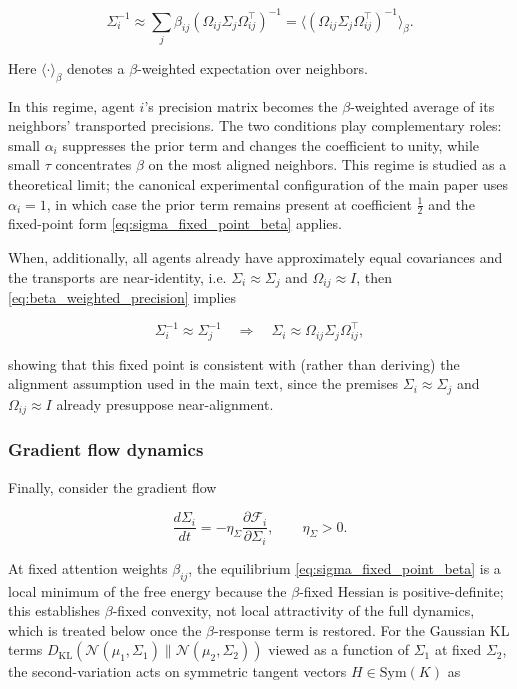 \documentclass[twoside,11pt]{article}
\begin{document}
\begin{equation}
\boxed{
\Sigma_i^{-1}
 \approx 
\sum_j \beta_{ij}
(\Omega_{ij}\Sigma_j\Omega_{ij}^\top)^{-1}
 = \big\langle(\Omega_{ij}\Sigma_j\Omega_{ij}^\top)^{-1}
\big\rangle_{\beta}.}
\label{eq:beta_weighted_precision}
\end{equation}

Here $\langle \cdot \rangle_{\beta}$ denotes a $\beta$-weighted expectation over neighbors.

In this regime, agent $i$'s precision matrix becomes the $\beta$-weighted average of its neighbors' transported precisions. The two conditions play complementary roles: small $\alpha_i$ suppresses the prior term and changes the coefficient to unity, while small $\tau$ concentrates $\beta$ on the most aligned neighbors. This regime is studied as a theoretical limit; the canonical experimental configuration of the main paper uses $\alpha_i = 1$, in which case the prior term remains present at coefficient $\frac{1}{2}$ and the fixed-point form \eqref{eq:sigma_fixed_point_beta} applies.

When, additionally, all agents already have approximately equal covariances and the transports are near-identity, i.e. $\Sigma_i \approx \Sigma_j$ and $\Omega_{ij} \approx I$, then \eqref{eq:beta_weighted_precision} implies

\begin{equation}
\Sigma_i^{-1} \approx \Sigma_j^{-1}
\quad\Longrightarrow\quad
\Sigma_i \approx \Omega_{ij}\Sigma_j\Omega_{ij}^\top,
\end{equation}

showing that this fixed point is consistent with (rather than deriving) the alignment assumption used in the main text, since the premises $\Sigma_i \approx \Sigma_j$ and $\Omega_{ij} \approx I$ already presuppose near-alignment.

\subsubsection{Gradient flow dynamics}

Finally, consider the gradient flow

\begin{equation}
\frac{d\Sigma_i}{dt}
=-\eta_\Sigma
\frac{\partial \mathcal{F}_i}{\partial \Sigma_i},
\qquad\eta_\Sigma > 0.
\end{equation}

At fixed attention weights $\beta_{ij}$, the equilibrium \eqref{eq:sigma_fixed_point_beta} is a local minimum of the free energy because the $\beta$-fixed Hessian is positive-definite; this establishes $\beta$-fixed convexity, not local attractivity of the full dynamics, which is treated below once the $\beta$-response term is restored. For the Gaussian KL terms $D_{\mathrm{KL}}(\mathcal{N}(\mu_1,\Sigma_1) \| \mathcal{N}(\mu_2,\Sigma_2))$ viewed as a function of $\Sigma_1$ at fixed $\Sigma_2$, the second-variation acts on symmetric tangent vectors $H \in \mathrm{Sym}(K)$ as
\end{document}
